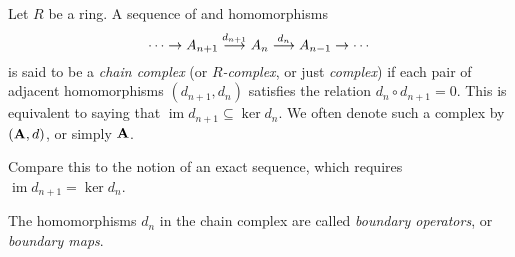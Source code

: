 \documentclass[12pt]{article}
\def\im{\operatorname{im}}
\def\ker{\operatorname{ker}}
\begin{document}

Let $R$ be a ring.
A sequence of  and homomorphisms
\[
  \cdots \rightarrow
  A_{n+1} \buildrel {d_{n+1}} \over \longrightarrow
  A_n \buildrel {d_n} \over \longrightarrow
  A_{n-1} \rightarrow
  \cdots
\]
is said to be a \emph{chain complex}
(or \emph{$R$-complex}, or just \emph{complex})
if each pair of adjacent homomorphisms $(d_{n+1}, d_n)$
satisfies the relation $d_n\circ d_{n+1} = 0$.
This is equivalent to saying that 
$\im d_{n+1} \subseteq \ker d_n$.
We often denote such a complex by $({\bold A}, d)$, or simply ${\bold A}$.

Compare this to the notion of an exact sequence,
which requires $\im d_{n+1} = \ker d_n$.

The homomorphisms $d_n$ in the chain complex
are called \emph{boundary operators}, or \emph{boundary maps}.

\end{document}
